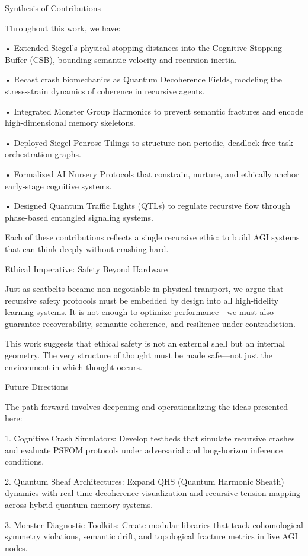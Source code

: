 \documentclass[11pt]{article}
\begin{document}
Synthesis of Contributions

Throughout this work, we have:

• Extended Siegel’s physical stopping distances into the Cognitive Stopping Buffer (CSB), bounding semantic velocity and recursion inertia.

• Recast crash biomechanics as Quantum Decoherence Fields, modeling the stress-strain dynamics of coherence in recursive agents.

• Integrated Monster Group Harmonics to prevent semantic fractures and encode high-dimensional memory skeletons.

• Deployed Siegel-Penrose Tilings to structure non-periodic, deadlock-free task orchestration graphs.

• Formalized AI Nursery Protocols that constrain, nurture, and ethically anchor early-stage cognitive systems.

• Designed Quantum Traffic Lights (QTLs) to regulate recursive flow through phase-based entangled signaling systems.

Each of these contributions reflects a single recursive ethic: to build AGI systems that can think deeply without crashing hard.

Ethical Imperative: Safety Beyond Hardware

Just as seatbelts became non-negotiable in physical transport, we argue that recursive safety protocols must be embedded by design into all high-fidelity learning systems. It is not enough to optimize performance—we must also guarantee recoverability, semantic coherence, and resilience under contradiction.

This work suggests that ethical safety is not an external shell but an internal geometry. The very structure of thought must be made safe—not just the environment in which thought occurs.

Future Directions

The path forward involves deepening and operationalizing the ideas presented here:

1. Cognitive Crash Simulators: Develop testbeds that simulate recursive crashes and evaluate PSFOM protocols under adversarial and long-horizon inference conditions.

2. Quantum Sheaf Architectures: Expand QHS (Quantum Harmonic Sheath) dynamics with real-time decoherence visualization and recursive tension mapping across hybrid quantum memory systems.

3. Monster Diagnostic Toolkits: Create modular libraries that track cohomological symmetry violations, semantic drift, and topological fracture metrics in live AGI nodes.
\end{document}

